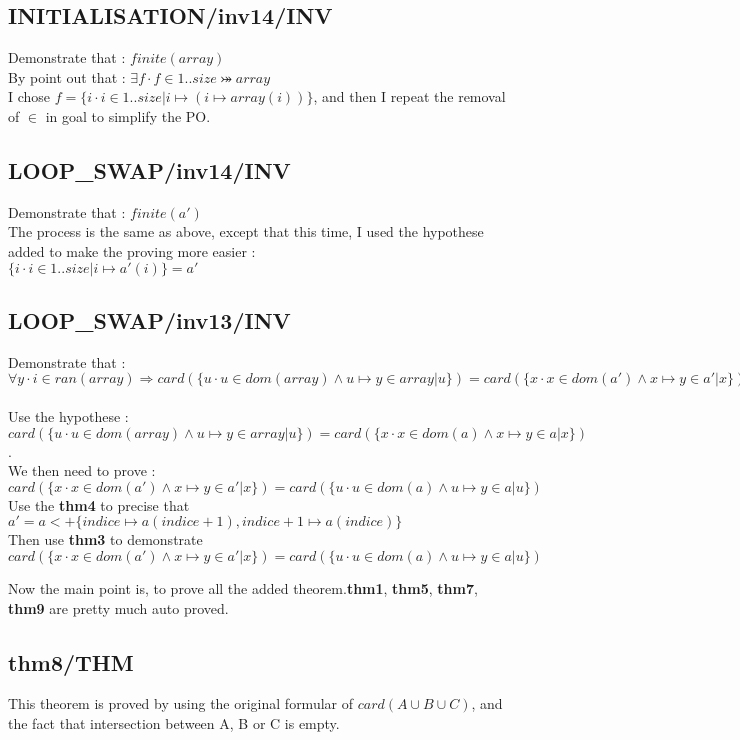\subsection{INITIALISATION/inv14/INV}
Demonstrate that : $finite(array)$ \\
By point out that : $\exists f \cdot f \in 1..size \bij array$ \\
I chose $f = \{i \cdot i\in 1..size | i \mapsto (i \mapsto array(i)) \}$, and then I repeat the removal of $\in$ in goal to simplify the PO.

\subsection{LOOP\_SWAP/inv14/INV}
Demonstrate that : $finite(a')$ \\
The process is the same as above, except that this time, I used the hypothese added to make the proving more easier : \\
$\{i \cdot i \in 1..size | i \mapsto a'(i)\} = a'$

\subsection{LOOP\_SWAP/inv13/INV}
Demonstrate that : \\
$\forall y \cdot i \in ran(array) \Rightarrow card(\{u \cdot u \in dom(array) \land u \mapsto y \in array | u\}) = card(\{x \cdot x \in dom(a') \land x \mapsto y \in a' | x\})$ \\

\paragraph{}
Use the hypothese : $card(\{u \cdot u \in dom(array) \land u \mapsto y \in array | u\}) = card(\{x \cdot x \in dom(a) \land x \mapsto y \in a | x\}) $. \\
We then need to prove : \\
$card(\{x \cdot x \in dom(a') \land x \mapsto y \in a' | x\}) = card(\{u \cdot u \in dom(a) \land u \mapsto y \in a | u\})$\\
Use the \textbf{thm4} to precise that $a' = a <+ \{indice \mapsto a(indice+1), indice+1 \mapsto a(indice) \}$ \\
Then use \textbf{thm3} to demonstrate $card(\{x \cdot x \in dom(a') \land x \mapsto y \in a' | x\}) = card(\{u \cdot u \in dom(a) \land u \mapsto y \in a | u\})$

Now the main point is, to prove all the added theorem.\textbf{thm1}, \textbf{thm5}, \textbf{thm7}, \textbf{thm9} are pretty much auto proved.

\subsection{thm8/THM}
This theorem is proved by using the original formular of $card(A \cup B \cup C)$, and the fact that intersection between A, B or C is empty.






